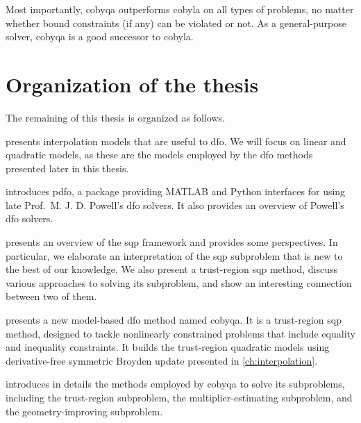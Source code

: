 \begin{enumerate}
\begin{enumerate}
        Most importantly, \gls{cobyqa} outperforms \gls{cobyla} on all types of problems, no matter whether bound constraints (if any) can be violated or not.
        As a general-purpose solver, \gls{cobyqa} is a good successor to \gls{cobyla}.
    \end{enumerate}
\end{enumerate}

\section{Organization of the thesis}

The remaining of this thesis is organized as follows.

 presents interpolation models that are useful to \gls{dfo}.
We will focus on linear and quadratic models, as these are the models employed by the \gls{dfo} methods presented later in this thesis.

 introduces \gls{pdfo}, a package providing MATLAB and Python interfaces for using late Prof.\ M. J. D. Powell's \gls{dfo} solvers.
It also provides an overview of Powell's \gls{dfo} solvers.

 presents an overview of the \gls{sqp} framework and provides some perspectives.
In particular, we elaborate an interpretation of the \gls{sqp} subproblem that is new to the best of our knowledge.
We also present a trust-region \gls{sqp} method, discuss various approaches to solving its subproblem, and show an interesting connection between two of them.

 presents a new model-based \gls{dfo} method named \gls{cobyqa}.
It is a trust-region \gls{sqp} method, designed to tackle nonlinearly constrained problems that include equality and inequality constraints.
It builds the trust-region quadratic models using derivative-free symmetric Broyden update presented in \cref{ch:interpolation}.

 introduces in details the methods employed by \gls{cobyqa} to solve its subproblems, including the trust-region subproblem, the multiplier-estimating subproblem, and the geometry-improving subproblem.

